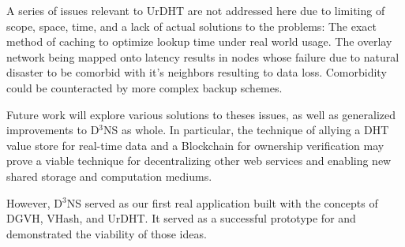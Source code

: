 A series of issues relevant to UrDHT are not addressed here due to limiting of scope, space, time, and a lack of actual solutions to the problems: The exact method of caching to optimize lookup time under real world usage. The overlay network being mapped onto latency results in nodes whose failure due to natural disaster to be comorbid with it's neighbors resulting to data loss. Comorbidity could be counteracted by more complex backup schemes.

Future work will explore various solutions to theses issues, as well as generalized improvements to D$^3$NS as whole.  In particular, the technique of allying a DHT value store for real-time data and a Blockchain for ownership verification may prove a viable technique for decentralizing other web services and enabling new shared storage and computation mediums.

However, D$^3$NS served as our first real application built with the concepts of DGVH, VHash, and UrDHT.
It served as a successful prototype for and demonstrated the viability of those ideas.
